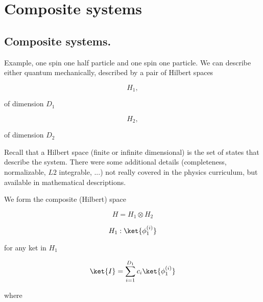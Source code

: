 
%

\chapter{Composite systems}
\label{chap:qmTwoL1}
{}
\date{Sept 12, 2011}

\beginArtWithToc

\section{Composite systems.}

Example, one spin one half particle and one spin one particle.  We can describe either quantum mechanically, described by a pair of Hilbert spaces

\begin{equation}\label{eqn:qmTwoL1:n}
H_1,
\end{equation}

of dimension $D_1$

\begin{equation}\label{eqn:qmTwoL1:n}
H_2,
\end{equation}

of dimension $D_2$

Recall that a Hilbert space (finite or infinite dimensional) is the set of states that describe the system.  There were some additional details (completeness, normalizable, $L2$ integrable, ...) not really covered in the physics curriculum, but available in mathematical descriptions.

We form the composite (Hilbert) space

\begin{equation}\label{eqn:qmTwoL1:n}
H = H_1 \otimes H_2
\end{equation}

\begin{equation}\label{eqn:qmTwoL1:n}
H_1 : { \ket{\phi_1^{(i)}} }
\end{equation}

for any ket in $H_1$

\begin{equation}\label{eqn:qmTwoL1:n}
\ket{I} = \sum_{i=1}^{D_1} c_i \ket{\phi_1^{(i)}} 
\end{equation}

where


